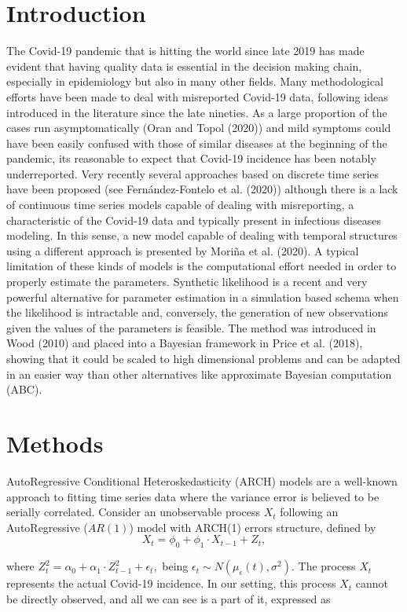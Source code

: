 \documentclass[twoside]{report}
\begin{document}
\section{Introduction}
The Covid-19 pandemic that is hitting the world since late 2019 has made evident that having quality data is essential in the decision making chain, especially in epidemiology but also in many other fields. Many methodological efforts have been made to deal with misreported Covid-19 data, following ideas introduced in the literature since the late nineties. As a large proportion of the cases run asymptomatically (Oran and Topol (2020)) and mild symptoms could have been easily confused with those of similar diseases at the beginning of the pandemic, its reasonable to expect that Covid-19 incidence has been notably underreported. Very recently several approaches based on discrete time series have been proposed (see Fern\'andez-Fontelo et al. (2020)) although there is a lack of continuous time series models capable of dealing with misreporting, a characteristic of the Covid-19 data and typically present in infectious diseases modeling. In this sense, a new model capable of dealing with temporal structures using a different approach is presented by Mori\~na et al. (2020). A typical limitation of these kinds of models is the computational effort needed in order to properly estimate the parameters. Synthetic likelihood is a recent and very powerful alternative for parameter estimation in a simulation based schema when the likelihood is intractable and, conversely, the generation of new observations given the values of the parameters is feasible. The method was introduced in Wood (2010) and placed into a Bayesian framework in Price et al. (2018), showing that it could be scaled to high dimensional problems and can be adapted in an easier way than other alternatives like approximate Bayesian computation (ABC).

\section{Methods}
AutoRegressive Conditional Heteroskedasticity (ARCH) models are a well-known approach to fitting time series data where the variance error is believed to be serially correlated. Consider an unobservable process $X_t$ following an AutoRegressive ($AR(1)$) model with ARCH(1) errors structure, defined by
$$
X_t = \phi_0 + \phi_1 \cdot X_{t-1} + Z_t,
$$

where $Z^2_t=\alpha_0+\alpha_1 \cdot Z^2_{t-1} + \epsilon_t,$ being $\epsilon_t \sim N(\mu_{\epsilon}(t), \sigma^2)$. The process $X_t$ represents the actual Covid-19 incidence. In our setting, this process $X_t$ cannot be directly observed, and all we can see is a part of it, expressed as
\end{document}
